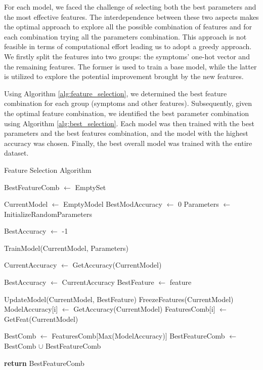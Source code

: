For each model, we faced the challenge of selecting both the best parameters and the most effective features. 
The interdependence between these two aspects makes the optimal approach to explore all the possible combination of features
and for each combination trying all the parameters combination. This approach is not feasible in terms of computational effort
leading us to adopt a greedy approach. We firstly split the features into two 
groups: the symptoms' one-hot vector and the remaining features. The former is used to train a base model, 
while the latter is utilized to explore the potential improvement brought by the new features.

Using Algorithm \ref{alg:feature_selection}, we determined the best feature combination for each group (symptoms and other features).
Subsequently, given the optimal feature combination, we identified the best parameter combination using Algorithm 
\ref{alg:best_selection}. Each model was then trained with the best parameters and the best features combination, 
and the model with the highest accuracy was chosen. Finally, the best overall model was trained with the entire dataset.


\begin{algorithm}[H] \small
	\caption{Feature Selection Algorithm}\label{alg:feature_selection}
	
	\begin{algorithmic}[1]
	
	\State BestFeatureComb $\gets$ EmptySet
	
	    \State CurrentModel $\gets$ EmptyModel
	    \State BestModAccuracy $\gets$ 0
	    \State Parameters $\gets$ InitializeRandomParameters
	
	    		\State BestAccuracy $\gets$ -1

				\State TrainModel(CurrentModel, Parameters)
			
				\State CurrentAccuracy $\gets$ GetAccuracy(CurrentModel)
			
					\State BestAccuracy $\gets$ CurrentAccuracy
					\State BestFeature $\gets$ feature
					
				\EndIf
				\State UpdateModel(CurrentModel, BestFeature)
			\EndFor
			\State FreezeFeatures(CurrentModel)
			\State ModelAccuracy[i] $\gets$ GetAccuracy(CurrentModel)
			\State FeaturesComb[i] $\gets$ GetFeat(CurrentModel)
	
	    \EndFor
	
	    \State BestComb $\gets$ FeaturesComb[Max(ModelAccuracy)]
	    \State BestFeatureComb $\gets$ BestComb $\cup$ BestFeatureComb
	
	\EndFor
	
	\State \textbf{return} BestFeatureComb
	\end{algorithmic}
\end{algorithm}

